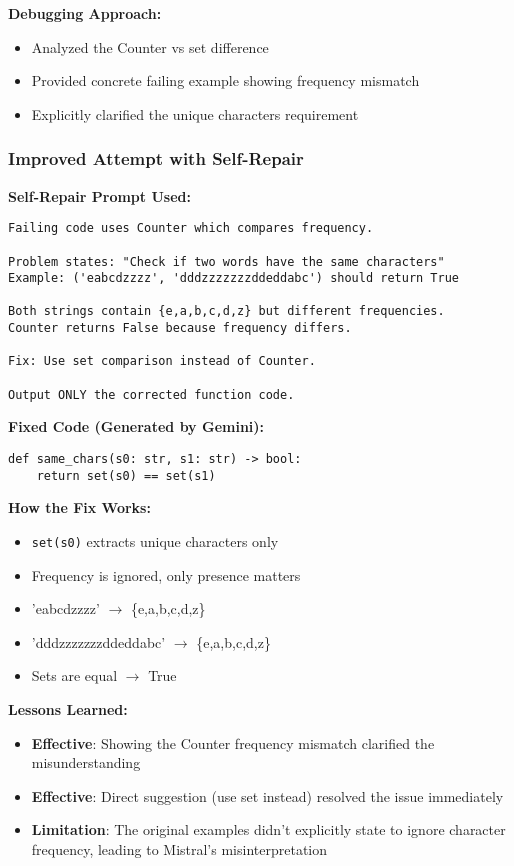 \documentclass[11pt]{article}
\begin{document}
\textbf{Debugging Approach:}
\begin{itemize}
    \item Analyzed the Counter vs set difference
    \item Provided concrete failing example showing frequency mismatch
    \item Explicitly clarified the unique characters requirement
\end{itemize}

\subsubsection{Improved Attempt with Self-Repair}

\textbf{Self-Repair Prompt Used:}
\begin{lstlisting}
Failing code uses Counter which compares frequency.

Problem states: "Check if two words have the same characters"
Example: ('eabcdzzzz', 'dddzzzzzzzddeddabc') should return True

Both strings contain {e,a,b,c,d,z} but different frequencies.
Counter returns False because frequency differs.

Fix: Use set comparison instead of Counter.

Output ONLY the corrected function code.
\end{lstlisting}

\textbf{Fixed Code (Generated by Gemini):}
\begin{lstlisting}
def same_chars(s0: str, s1: str) -> bool:
    return set(s0) == set(s1)
\end{lstlisting}

\textbf{How the Fix Works:}
\begin{itemize}
    \item \texttt{set(s0)} extracts unique characters only
    \item Frequency is ignored, only presence matters
    \item 'eabcdzzzz' $\rightarrow$ \{e,a,b,c,d,z\}
    \item 'dddzzzzzzzddeddabc' $\rightarrow$ \{e,a,b,c,d,z\}
    \item Sets are equal $\rightarrow$ True
\end{itemize}

\textbf{Lessons Learned:}
\begin{itemize}
    \item \textbf{Effective}: Showing the Counter frequency mismatch clarified the misunderstanding
    \item \textbf{Effective}: Direct suggestion (use set instead) resolved the issue immediately
    \item \textbf{Limitation}: The original examples didn't explicitly state to ignore character frequency, leading to Mistral's misinterpretation
\end{itemize}
\end{document}
